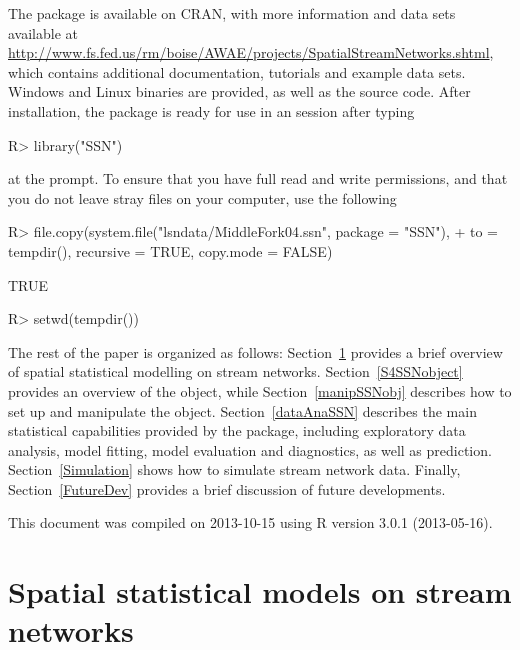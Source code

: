 \documentclass[nojss]{jss}
\renewenvironment{Schunk}{\vspace{\topsep}}{\vspace{\topsep}}
\begin{document}
The  package is available on CRAN, with more information and data sets available at
\url{http://www.fs.fed.us/rm/boise/AWAE/projects/SpatialStreamNetworks.shtml}, which contains additional documentation, tutorials and example data sets. Windows and Linux binaries are provided, as well as the source code. After installation, the package is ready for use in an  session after typing
\begin{Schunk}
\begin{Sinput}
R> library("SSN")
\end{Sinput}
\end{Schunk}
at the  prompt.  To ensure that you have full read and write permissions, and that you do not leave stray files on your computer, use the following
\begin{Schunk}
\begin{Sinput}
R> file.copy(system.file("lsndata/MiddleFork04.ssn", package = "SSN"),
+    to = tempdir(), recursive = TRUE, copy.mode = FALSE)
\end{Sinput}
\begin{Soutput}
[1] TRUE
\end{Soutput}
\begin{Sinput}
R> setwd(tempdir())
\end{Sinput}
\end{Schunk}

The rest of the paper is organized as follows:
Section~\ref{TheoryModels} provides a brief overview of spatial
statistical modelling on stream networks. Section~\ref{S4SSNobject}
provides an overview of the  
object, while Section~\ref{manipSSNobj} describes how to set up and
manipulate the object. Section~\ref{dataAnaSSN} describes the main
statistical capabilities provided by the package, including
exploratory data analysis, model fitting, model evaluation and
diagnostics, as well as prediction. Section~\ref{Simulation} shows how
to simulate stream network data. Finally, Section~\ref{FutureDev}
provides a brief discussion of future developments.

This document was compiled on 2013-10-15 using
R version 3.0.1 (2013-05-16).

%
%

\section{Spatial statistical models on stream networks} \label{TheoryModels}
\end{document}
